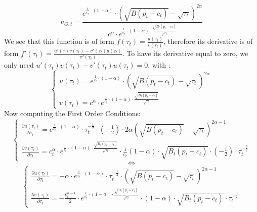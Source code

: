 \documentclass{article}
\begin{document}
\begin{equation}\tag{9}
    u_{G,t}=\frac{e^{\frac{1}{c_{t}}\cdot\left(1-\alpha\right)}\cdot\left(\sqrt{B(p_{t}-c_{t})}-\sqrt{\tau_{t}}\right)^{2\alpha}}{c^{\alpha}\cdot e^{\frac{1}{c_{t}}\cdot(1-\alpha)\cdot\frac{\sqrt{B_{t}(p_{t}-c_{t})}}{\sqrt{\tau_{t}}}}}
\end{equation}
We see that this function is of form $f(\tau_{t})=\frac{u(\tau_{t})}{v(\tau_{t})}$, therefore its derivative is of form $f'(\tau_{t})=\frac{u'(\tau)v(\tau_{t})-v'(\tau_{t})u(\tau_{t})}{v^2(\tau_{t})}$. To have its derivative equal to zero, we only need $u'(\tau_{t})v(\tau_{t})-v'(\tau_{t})u(\tau_{t})=0$, with :
\begin{equation*}
    \begin{cases}
        u(\tau_{t})= e^{\frac{1}{c_{t}}\cdot\left(1-\alpha\right)}\cdot\left(\sqrt{B(p_{t}-c_{t})}-\sqrt{\tau_{t}}\right)^{2\alpha}\\
        v(\tau_{t})= c^{\alpha}\cdot e^{\frac{1}{c_{t}}\cdot(1-\alpha)\cdot\frac{\sqrt{B_{t}(p_{t}-c_{t})}}{\sqrt{\tau_{t}}}}
    \end{cases}
\end{equation*}
Now computing the First Order Conditions:
\begin{equation*}
    \begin{cases}
        \frac{\partial u(\tau_{t})}{\partial \tau_{t}}= e^{\frac{1}{c_{t}}\cdot\left(1-\alpha\right)}\cdot \tau_{t}^{-\frac{1}{2}}\cdot \left(-\frac{1}{2}\right)\cdot 2\alpha \left(\sqrt{B(p_{t}-c_{t})}-\sqrt{\tau_{t}}\right)^{2\alpha-1} \\
        \frac{\partial v(\tau_{t})}{\partial \tau_{t}}= c_{t}^{\alpha}\cdot e^{\frac{1}{c_{t}}\cdot(1-\alpha)\cdot\frac{\sqrt{B_{t}(p_{t}-c_{t})}}{\sqrt{\tau_{t}}}}\cdot \frac{1}{c_{t}}(1-\alpha)\cdot\sqrt{B_{t}(p_{t}-c_{t})}\cdot\left(-\frac{1}{2}\right)\cdot\tau_{t}^{-\frac{3}{2}}
    \end{cases}
\end{equation*}
$$\iff$$
\begin{equation*}
    \begin{cases}
        \frac{\partial u(\tau_{t})}{\partial \tau_{t}}= -\alpha\cdot e^{\frac{1}{c_{t}}\cdot\left(1-\alpha\right)}\cdot \tau_{t}^{-\frac{1}{2}}\cdot \left(\sqrt{B(p_{t}-c_{t})}-\sqrt{\tau_{t}}\right)^{2\alpha-1} \\
        \frac{\partial v(\tau_{t})}{\partial \tau_{t}}= -\frac{c_{t}^{\alpha-1}}{2}\cdot e^{\frac{1}{c_{t}}\cdot(1-\alpha)\cdot\frac{\sqrt{B_{t}(p_{t}-c_{t})}}{\sqrt{\tau_{t}}}}\cdot (1-\alpha)\cdot\sqrt{B_{t}(p_{t}-c_{t})}\cdot\tau_{t}^{-\frac{3}{2}}
    \end{cases}
\end{equation*}
\end{document}
